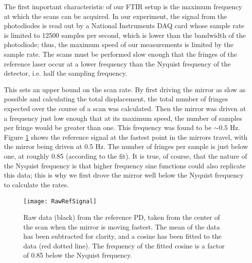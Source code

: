\documentclass[12pt]{puthesis}
\begin{document}
The first important characteristic of our FTIR setup is the maximum frequency at which the scans can be acquired. In our experiment, the signal from the photodiodes is read out by a National Instruments DAQ card whose sample rate is limited to 12500 samples per second, which is lower than the bandwidth of the photodiode; thus, the maximum speed of our measurements is limited by the sample rate. The scans must be performed slow enough that the fringes of the reference laser occur at a lower frequency than the Nyquist frequency of the detector, i.e. half the sampling frequency.

This sets an upper bound on the scan rate. By first driving the mirror as slow as possible and calculating the total displacement, the total number of fringes expected over the course of a scan was calculated. Then the mirror was driven at a frequency just low enough that at its maximum speed, the number of samples per fringe would be greater than one. This frequency was found to be $\sim 0.5$ Hz. Figure \ref{fig:reference} shows the reference signal at the fastest point in the mirrors travel, with the mirror being driven at 0.5 Hz. The number of fringes per sample is just below one, at roughly 0.85 (according to the fit). It is true, of course, that the nature of the Nyquist frequency is that higher frequency sine functions could also replicate this data; this is why we first drove the mirror well below the Nyquist frequency to calculate the rates.

\begin{figure}[t]
  \centering
  \texttt{[image: RawRefSignal]}
  \caption{Raw data (black) from the reference PD, taken from the center of the scan when the mirror is moving fastest. The mean of the data has been subtracted for clarity, and a cosine has been fitted to the data (red dotted line). The frequency of the fitted cosine is a factor of 0.85 below the Nyquist frequency.}
  \label{fig:reference}
\end{figure}
\end{document}
